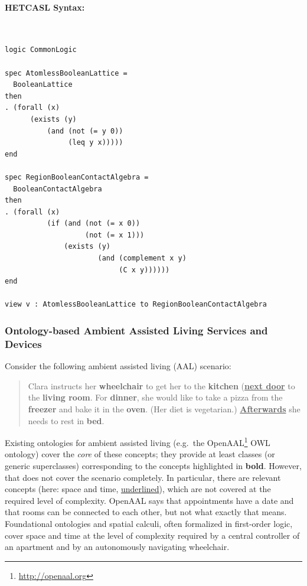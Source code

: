 \documentclass{article}
\newcommand{\normalTEXTSC}[2]{{#1\scriptsize#2}}
\newcommand{\HetCASL}{\normalTEXTSC{H}{ET}\normalTEXTSC{C}{ASL}\xspace}
\begin{document}
\paragraph{\HetCASL Syntax:}~\\
\begin{lstlisting}[language=hetcasl,morekeywords={forall,exists,and,not,if}]
logic CommonLogic

spec AtomlessBooleanLattice =
  BooleanLattice
then
. (forall (x)
	  (exists (y)
		  (and (not (= y 0))
		       (leq y x)))))
end

spec RegionBooleanContactAlgebra =
  BooleanContactAlgebra
then
. (forall (x)     
          (if (and (not (= x 0)) 
                   (not (= x 1))) 
              (exists (y)
                      (and (complement x y)
                           (C x y))))))
end

view v : AtomlessBooleanLattice to RegionBooleanContactAlgebra
\end{lstlisting}


\subsubsection{Ontology-based Ambient Assisted Living Services and Devices}
\label{sec:aal-example}

Consider the following ambient assisted living (AAL) scenario:
\begin{quote}
  Clara instructs her \textbf{wheelchair} to get her to the \textbf{kitchen} (\textbf{\underline{next door}} to the \textbf{living room}.  For \textbf{dinner}, she would like to take a pizza from the \textbf{freezer} and bake it in the \textbf{oven}.  (Her diet is vegetarian.)  \textbf{\underline{Afterwards}} she needs to rest in \textbf{bed}.
\end{quote}
Existing ontologies for ambient assisted living (e.g.\ the OpenAAL\footnote{\url{http://openaal.org}} OWL ontology) cover the \emph{core} of these  concepts; they provide at least classes (or generic superclasses) corresponding to the concepts highlighted in \textbf{bold}.  However, that does not cover the scenario completely.  In particular, there are relevant concepts (here: space and time, \underline{underlined}), which are not covered at the required level of complexity.  OpenAAL says that appointments have a date and that rooms can be connected to each other, but not what exactly that means.  Foundational ontologies and spatial calculi, often formalized in first-order logic, cover space and time at the level of complexity required by a central controller of an apartment and by an autonomously navigating wheelchair.
\end{document}
